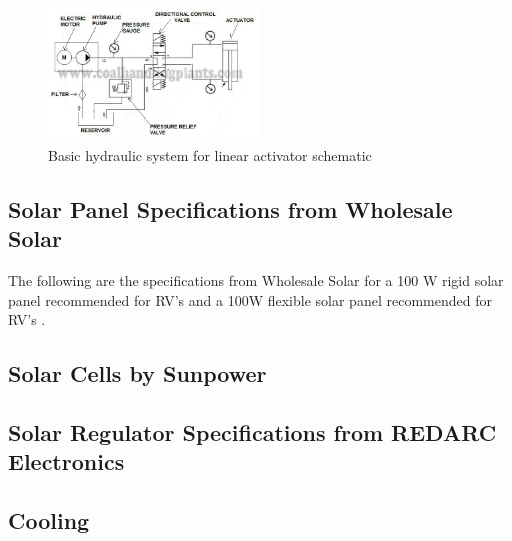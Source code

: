 \begin{figure}[H]
    \centering
    \includegraphics[width=0.5\textwidth]{Sections/LiteratureReview/img/drive/hydraulic_schematic.jpg}
    \caption{Basic hydraulic system for linear activator schematic \cite{coal_handling_plants_basic_2017}}
    \label{fig:hydraulic_linear_schematic}
\end{figure}

\subsection{Solar Panel Specifications from Wholesale Solar} \label{app:solar}

The following are the specifications from Wholesale Solar for a 100 W rigid solar panel recommended for RV's \cite{wholesale_solar_solarland_nodate} and a 100W flexible solar panel recommended for RV's \cite{wholesale_solar_sunpower_nodate}.





\subsection{Solar Cells by Sunpower \cite{sunpower_buy_2017}}



\subsection{Solar Regulator Specifications from REDARC Electronics \cite{redarc_electronics_20a_nodate}}




\subsection{Cooling} \label{app:cooling}

